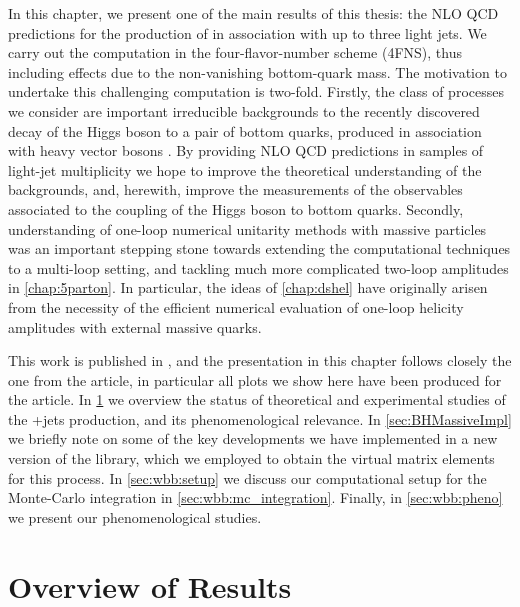 In this chapter, we present one of the main results of this thesis:
the NLO QCD predictions for the production of \Wbb{} in association with up to three light jets.
We carry out the computation in the four-flavor-number scheme (4FNS), thus including effects due to the non-vanishing bottom-quark mass.
The motivation to undertake this challenging computation is two-fold.
Firstly, the class of processes we consider are important irreducible backgrounds to the recently discovered decay of the Higgs boson 
to a pair of bottom quarks, produced in association with heavy vector bosons \cite{Sirunyan:2018kst,Aaboud:2018zhk}.
By providing NLO QCD predictions in samples of light-jet multiplicity we hope to improve the theoretical 
understanding of the backgrounds, and, herewith, improve the measurements of the observables associated to 
the coupling of the Higgs boson to bottom quarks.
Secondly, understanding of one-loop numerical unitarity methods with massive particles
was an important stepping stone towards extending the computational techniques to a multi-loop setting,
and tackling much more complicated two-loop amplitudes in \cref{chap:5parton}.
In particular, the ideas of \cref{chap:dshel} have originally arisen from the necessity of the efficient
numerical evaluation of one-loop helicity amplitudes with external massive quarks.

This work is published in \cite{Anger:2017glm}, 
and the presentation in this chapter follows closely the one from the article,
in particular all plots we show here have been produced for the article.
In \cref{sec:wbb:relevance} we overview the status of theoretical and experimental studies of
the \Wbb{}+jets production, and its phenomenological relevance.
In \cref{sec:BHMassiveImpl} we briefly note on some of the
key developments we have implemented in a new version of the \BlackHat{} library,
which we employed to obtain the virtual matrix elements for this process.
In \cref{sec:wbb:setup} we discuss our computational setup for the Monte-Carlo integration
in \cref{sec:wbb:mc_integration}. Finally, in \cref{sec:wbb:pheno} we present our phenomenological studies.

\section{Overview of Results}
\label{sec:wbb:relevance}

